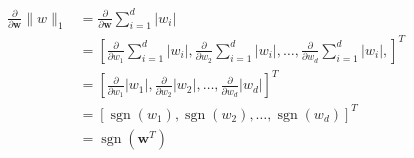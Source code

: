 \newcommand{\matrix}[1]{\mathbf{#1}}
\newcommand{\vector}[1]{\mathbf{#1}}
\newcommand{\X}{\matrix{X}}
\newcommand{\y}{\vector{y}}
\newcommand{\w}{\vector{w}}
\DeclareMathOperator{\sgn}{sgn}
\begin{align*}
\frac{\partial}{\partial \w} \|w\|_1 &= \frac{\partial}{\partial \w} \sum_{i=1}^d{|w_i|} \\
&= \left[ \frac{\partial}{\partial w_1} \sum_{i=1}^d{|w_i|}, \frac{\partial}{\partial w_2} \sum_{i=1}^d{|w_i|}, \ldots, \frac{\partial}{\partial w_d} \sum_{i=1}^d{|w_i|}, \right]^T \\
&= \left[ \frac{\partial}{\partial w_1} |w_1|, \frac{\partial}{\partial w_2} |w_2|, \ldots, \frac{\partial}{\partial w_d} |w_d| \right]^T \\
&= \left[ \sgn(w_1), \sgn(w_2), \ldots, \sgn(w_d) \right]^T \\
&= \sgn(\w^T) \\
\end{align*}
